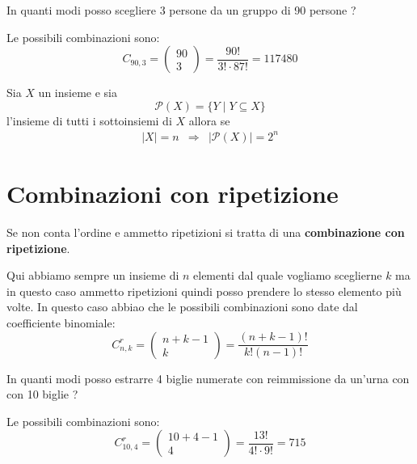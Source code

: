 \begin{example}
	In quanti modi posso scegliere 3 persone da un gruppo di 90 persone ?

	Le possibili combinazioni sono:
	\begin{equation*}
		C_{90, 3} =
		\begin{pmatrix}
			90 \\ 3
		\end{pmatrix} =
		\frac{90!}{3! \cdot 87!} = 117480
	\end{equation*}
\end{example}

\begin{theorem}
	Sia $X$ un insieme e sia
	\begin{equation*}
		\mathcal{P}(X) = \{ Y \mid Y \subseteq X \}
	\end{equation*}
	l'insieme di tutti i sottoinsiemi di $X$ allora se
	\begin{equation*}
		\begin{array}{ccc}
			|X| = n & \Rightarrow & |\mathcal{P}(X)| = 2^n
		\end{array}
	\end{equation*}
\end{theorem}

\section{Combinazioni con ripetizione}
\begin{definition}
	Se non conta l'ordine e ammetto ripetizioni si tratta di una
	\textbf{combinazione con ripetizione}.
\end{definition}

Qui abbiamo sempre un insieme di $n$ elementi dal quale vogliamo sceglierne $k$ ma in questo caso
ammetto ripetizioni quindi posso prendere lo stesso elemento pi\`u volte.
In questo caso abbiao che le possibili combinazioni sono date dal coefficiente binomiale:
\begin{equation*}
	C_{n, k}^r =
	\begin{pmatrix}
		n + k - 1 \\ k
	\end{pmatrix} =
	\frac{(n + k - 1)!}{k! (n - 1)!}
\end{equation*}

\begin{example}
	In quanti modi posso estrarre 4 biglie numerate con reimmissione da un'urna con con
	10 biglie ?

	Le possibili combinazioni sono:
	\begin{equation*}
		C_{10, 4}^r =
		\begin{pmatrix}
			10 + 4 - 1 \\ 4
		\end{pmatrix} =
		\frac{13!}{4! \cdot 9!} = 715
	\end{equation*}
\end{example}

